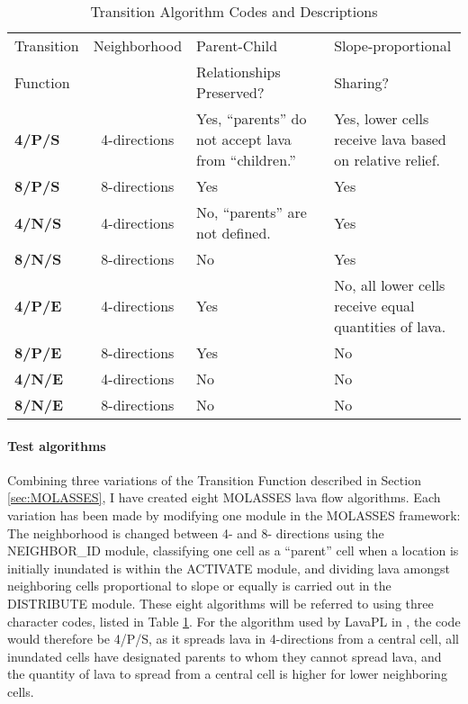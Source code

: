 		\begin{table}[h]
		\centering
		\caption{Transition Algorithm Codes and Descriptions}
		\begin{tabular}{l c p{5cm} p{5cm}}
			\toprule
			Transition&Neighborhood&Parent-Child&Slope-proportional\\
			Function&&Relationships Preserved?&Sharing?\\
			\midrule
			\textbf{4/P/S} &4-directions & Yes, ``parents'' do not accept lava from ``children.'' & Yes, lower cells receive lava based on relative relief.\\
			\textbf{8/P/S} &8-directions & Yes & Yes\\
			\textbf{4/N/S} &4-directions & No, ``parents'' are not defined. & Yes\\
			\textbf{8/N/S} &8-directions & No  & Yes\\
			\textbf{4/P/E} &4-directions & Yes & No, all lower cells receive equal quantities of lava.\\
			\textbf{8/P/E} &8-directions & Yes & No\\
			\textbf{4/N/E} &4-directions & No  & No\\
			\textbf{8/N/E} &8-directions & No  & No\\
			
			\bottomrule
		\end{tabular}
		\label{tab_algorithmcodes}
		\end{table}

\paragraph{Test algorithms} Combining three variations of the Transition Function described in Section \ref{sec:MOLASSES}, I have created eight MOLASSES lava flow algorithms. Each variation has been made by modifying one module in the MOLASSES framework: The neighborhood is changed between 4- and 8- directions using the NEIGHBOR\_ID module, classifying one cell as a ``parent'' cell when a location is initially inundated is within the ACTIVATE module, and dividing lava amongst neighboring cells proportional to slope or equally is carried out in the DISTRIBUTE module. These eight algorithms will be referred to using three character codes, listed in Table \ref{tab_algorithmcodes}. For the algorithm used by LavaPL in \citet{connor2012probabilistic}, the code would therefore be 4/P/S, as it spreads lava in 4-directions from a central cell, all inundated cells have designated parents to whom they cannot spread lava, and the quantity of lava to spread from a central cell is higher for lower neighboring cells.


